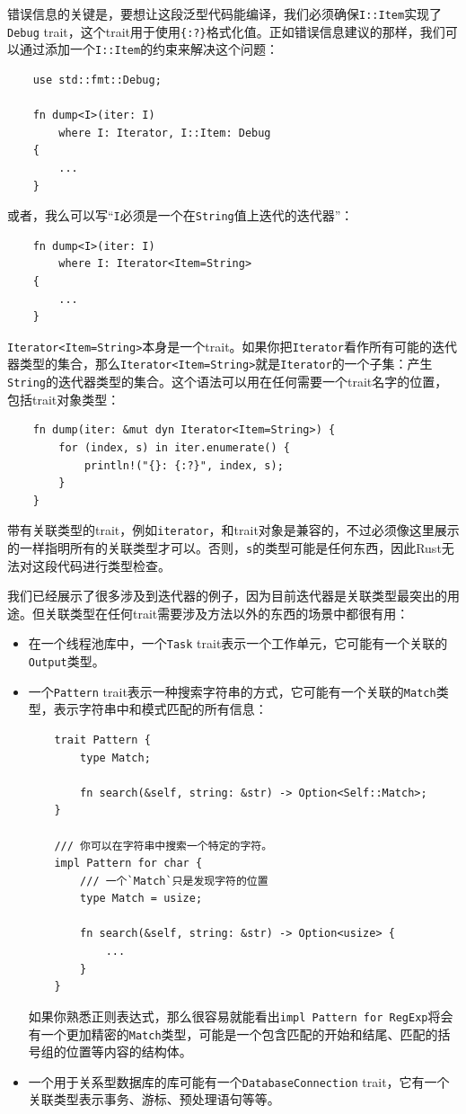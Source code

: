 错误信息的关键是，要想让这段泛型代码能编译，我们必须确保\texttt{I::Item}实现了\texttt{Debug} trait，这个trait用于使用\texttt{\{:?\}}格式化值。正如错误信息建议的那样，我们可以通过添加一个\texttt{I::Item}的约束来解决这个问题：
\begin{verbatim}
    use std::fmt::Debug;

    fn dump<I>(iter: I)
        where I: Iterator, I::Item: Debug
    {
        ...
    }
\end{verbatim}

或者，我么可以写“\texttt{I}必须是一个在\texttt{String}值上迭代的迭代器”：
\begin{verbatim}
    fn dump<I>(iter: I)
        where I: Iterator<Item=String>
    {
        ...
    }
\end{verbatim}

\texttt{Iterator<Item=String>}本身是一个trait。如果你把\texttt{Iterator}看作所有可能的迭代器类型的集合，那么\texttt{Iterator<Item=String>}就是\texttt{Iterator}的一个子集：产生\texttt{String}的迭代器类型的集合。这个语法可以用在任何需要一个trait名字的位置，包括trait对象类型：
\begin{verbatim}
    fn dump(iter: &mut dyn Iterator<Item=String>) {
        for (index, s) in iter.enumerate() {
            println!("{}: {:?}", index, s);
        }
    }
\end{verbatim}

带有关联类型的trait，例如\texttt{iterator}，和trait对象是兼容的，不过必须像这里展示的一样指明所有的关联类型才可以。否则，\texttt{s}的类型可能是任何东西，因此Rust无法对这段代码进行类型检查。

我们已经展示了很多涉及到迭代器的例子，因为目前迭代器是关联类型最突出的用途。但关联类型在任何trait需要涉及方法以外的东西的场景中都很有用：

\begin{itemize}
    \item 在一个线程池库中，一个\texttt{Task} trait表示一个工作单元，它可能有一个关联的\texttt{Output}类型。
    \item 一个\texttt{Pattern} trait表示一种搜索字符串的方式，它可能有一个关联的\texttt{Match}类型，表示字符串中和模式匹配的所有信息：
    \begin{verbatim}
    trait Pattern {
        type Match;

        fn search(&self, string: &str) -> Option<Self::Match>;
    }

    /// 你可以在字符串中搜索一个特定的字符。
    impl Pattern for char {
        /// 一个`Match`只是发现字符的位置
        type Match = usize;

        fn search(&self, string: &str) -> Option<usize> {
            ...
        }
    }
    \end{verbatim}

    如果你熟悉正则表达式，那么很容易就能看出\texttt{impl Pattern for RegExp}将会有一个更加精密的\texttt{Match}类型，可能是一个包含匹配的开始和结尾、匹配的括号组的位置等内容的结构体。

    \item 一个用于关系型数据库的库可能有一个\texttt{DatabaseConnection} trait，它有一个关联类型表示事务、游标、预处理语句等等。
\end{itemize}

